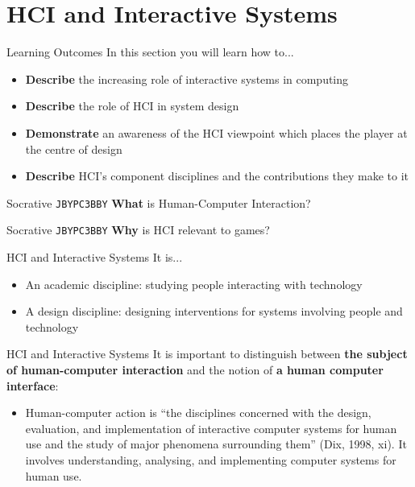 \part{HCI and Interactive Systems}
\frame{\partpage}

\begin{frame}{Learning Outcomes}
	In this section you will learn how to...
	
	\begin{itemize}
		\item \textbf{Describe} the increasing role of interactive systems in computing
		\item \textbf{Describe} the role of HCI in system design
		\item \textbf{Demonstrate} an awareness of the HCI viewpoint which places the player at the centre of design
		\item \textbf{Describe} HCI's component disciplines and the contributions they make to it
	\end{itemize}
\end{frame}

\begin{frame}[fragile]{Socrative \texttt{JBYPC3BBY}}
    \textbf{What} is Human-Computer Interaction?
\end{frame}

\begin{frame}[fragile]{Socrative \texttt{JBYPC3BBY}}
    \textbf{Why} is HCI relevant to games?
\end{frame}

\begin{frame}{HCI and Interactive Systems}
	It is...
	\begin{itemize}
		\item An academic discipline: studying people interacting with technology
		\item A design discipline: designing interventions for systems involving people and technology
	\end{itemize}
\end{frame}

\begin{frame}{HCI and Interactive Systems}
	It is important to distinguish between \textbf{the subject of human-computer interaction} and the notion of
	\textbf{a human computer interface}:
	
	\begin{itemize}
		\item Human-computer action is ``the disciplines concerned with the design, evaluation, 
		and implementation of interactive computer systems for human use and the study of major phenomena
		surrounding them'' (Dix, 1998, xi). It involves understanding, analysing, and implementing computer
		systems for human use.
	\end{itemize}
\end{frame}

